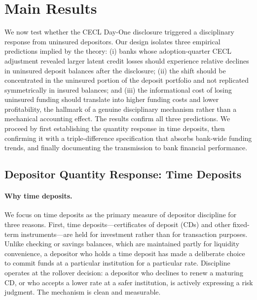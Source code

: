 
\section{Main Results}
\label{sec:results}

We now test whether the CECL Day-One disclosure triggered a disciplinary
response from uninsured depositors. Our design isolates three empirical
predictions implied by the theory: (i) banks whose adoption-quarter CECL
adjustment revealed larger latent credit losses should experience relative
declines in uninsured deposit balances after the disclosure; (ii) the shift
should be concentrated in the uninsured portion of the deposit portfolio and not
replicated symmetrically in insured balances; and (iii) the informational cost of
losing uninsured funding should translate into higher funding costs and lower
profitability, the hallmark of a genuine disciplinary mechanism rather than a
mechanical accounting effect. The results confirm all three predictions. We
proceed by first establishing the quantity response in time deposits, then
confirming it with a triple-difference specification that absorbs bank-wide
funding trends, and finally documenting the transmission to bank financial
performance.

\subsection{Depositor Quantity Response: Time Deposits}
\label{sec:results:time_deposits}

\paragraph{Why time deposits.}
We focus on time deposits as the primary measure of depositor discipline for
three reasons. First, time deposits---certificates of deposit (CDs) and other
fixed-term instruments---are held for investment rather than for transaction
purposes. Unlike checking or savings balances, which are maintained partly for
liquidity convenience, a depositor who holds a time deposit has made a deliberate
choice to commit funds at a particular institution for a particular rate.
Discipline operates at the rollover decision: a depositor who declines to renew a
maturing CD, or who accepts a lower rate at a safer institution, is actively
expressing a risk judgment. The mechanism is clean and measurable.

